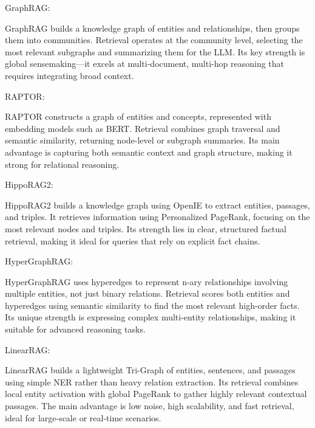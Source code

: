 \label{fig:llm-descriptions}








\begin{tcolorbox}[
    mygreenbox,
    enhanced jigsaw,
    width=\textwidth,
    title={Descriptions of GraphRAG Candidates},
    fonttitle=\Large\bfseries,
    before upper={
        \setlength{\parindent}{0pt}
        \setlength{\parskip}{0pt}
    }
]

GraphRAG:\par\noindent
GraphRAG builds a knowledge graph of entities and relationships, then groups them into communities. Retrieval operates at the community level, selecting the most relevant subgraphs and summarizing them for the LLM. Its key strength is global sensemaking—it excels at multi-document, multi-hop reasoning that requires integrating broad context.\par\noindent

\medskip
RAPTOR:\par\noindent
RAPTOR constructs a graph of entities and concepts, represented with embedding models such as BERT. Retrieval combines graph traversal and semantic similarity, returning node-level or subgraph summaries. Its main advantage is capturing both semantic context and graph structure, making it strong for relational reasoning. \par\noindent

\medskip
HippoRAG2:\par\noindent
HippoRAG2 builds a knowledge graph using OpenIE to extract entities, passages, and triples. It retrieves information using Personalized PageRank, focusing on the most relevant nodes and triples. Its strength lies in clear, structured factual retrieval, making it ideal for queries that rely on explicit fact chains. \par\noindent

\medskip
HyperGraphRAG:\par\noindent
HyperGraphRAG uses hyperedges to represent n-ary relationships involving multiple entities, not just binary relations. Retrieval scores both entities and hyperedges using semantic similarity to find the most relevant high-order facts. Its unique strength is expressing complex multi-entity relationships, making it suitable for advanced reasoning tasks. \par\noindent

\medskip
LinearRAG:\par\noindent
LinearRAG builds a lightweight Tri-Graph of entities, sentences, and passages using simple NER rather than heavy relation extraction. Its retrieval combines local entity activation with global PageRank to gather highly relevant contextual passages. The main advantage is low noise, high scalability, and fast retrieval, ideal for large-scale or real-time scenarios. \par\noindent

\end{tcolorbox}
\label{fig:graphrag-descriptions}

